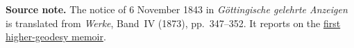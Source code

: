 \par\medskip\begin{small}\noindent\textbf{Source note.} The notice of 6 November 1843 in \textit{Göttingische gelehrte Anzeigen} is translated from \textit{Werke}, Band~IV (1873), pp.~347--352. It reports on the \hyperlink{geodaesie1.0}{first higher-geodesy memoir}.\par\end{small}
